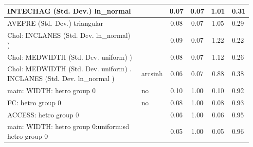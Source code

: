 \begin{table}
\begin{center}
\begin{tabular}{|l|l|c|c|c|l|}
			\hline
			INTECHAG (Std. Dev.) ln_normal &  & 0.07 & 0.07 & 1.01 & 0.31 \\
			\hline
			AVEPRE (Std. Dev.) triangular &  & 0.08 & 0.07 & 1.05 & 0.29 \\
			\hline
			 Chol: INCLANES (Std. Dev. ln_normal) ) &  & 0.09 & 0.07 & 1.22 & 0.22 \\
			\hline
			 Chol: MEDWIDTH (Std. Dev. uniform) ) &  & 0.08 & 0.07 & 1.12 & 0.26 \\
			\hline
			 Chol: MEDWIDTH (Std. Dev. uniform) . INCLANES (Std. Dev.   ln_normal ) & arcsinh & 0.06 & 0.07 & 0.88 & 0.38 \\
			\hline
			main: WIDTH: hetro group 0 & no & 0.10 & 1.00 & 0.10 & 0.92 \\
			\hline
			FC: hetro group 0 & no & 0.08 & 1.00 & 0.08 & 0.93 \\
			\hline
			ACCESS: hetro group 0 &  & 0.06 & 1.00 & 0.06 & 0.95 \\
			\hline
			main: WIDTH: hetro group 0:uniform:sd  hetro group 0 &  & 0.05 & 1.00 & 0.05 & 0.96 \\
			\hline
		\end{tabular}
	\end{center}
\end{table}